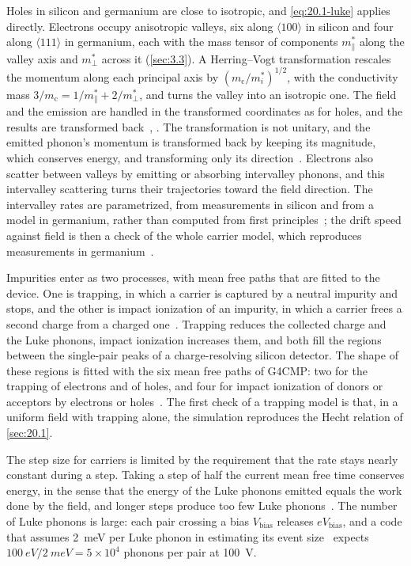 Holes in silicon and germanium are close to isotropic, and \cref{eq:20.1-luke} applies directly. Electrons occupy anisotropic valleys, six along $\langle100\rangle$ in silicon and four along $\langle111\rangle$ in germanium, each with the mass tensor of components $m^*_\parallel$ along the valley axis and $m^*_\perp$ across it (\cref{sec:3.3}). A Herring--Vogt transformation rescales the momentum along each principal axis by $(m_{\mathrm{c}}/m^*_i)^{1/2}$, with the conductivity mass $3/m_{\mathrm{c}} = 1/m^*_\parallel + 2/m^*_\perp$, and turns the valley into an isotropic one. The field and the emission are handled in the transformed coordinates as for holes, and the results are transformed back~\cite{herring1956transport}, \cite[Eqs.~(11)--(12)]{kelsey2023g4cmp}. The transformation is not unitary, and the emitted phonon's momentum is transformed back by keeping its magnitude, which conserves energy, and transforming only its direction~\cite[Sect.~V\,C]{leman2012invited}. Electrons also scatter between valleys by emitting or absorbing intervalley phonons, and this intervalley scattering turns their trajectories toward the field direction. The intervalley rates are parametrized, from measurements in silicon and from a model in germanium, rather than computed from first principles~\cite[Sect.~2.3]{kelsey2023g4cmp}; the drift speed against field is then a check of the whole carrier model, which reproduces measurements in germanium~\cite[Fig.~7]{kelsey2023g4cmp}.

Impurities enter as two processes, with mean free paths that are fitted to the device. One is trapping, in which a carrier is captured by a neutral impurity and stops, and the other is impact ionization of an impurity, in which a carrier frees a second charge from a charged one~\cite[Eqs.~(13)--(16)]{kelsey2023g4cmp}. Trapping reduces the collected charge and the Luke phonons, impact ionization increases them, and both fill the regions between the single-pair peaks of a charge-resolving silicon detector. The shape of these regions is fitted with the six mean free paths of G4CMP: two for the trapping of electrons and of holes, and four for impact ionization of donors or acceptors by electrons or holes~\cite[Sect.~2.3 and Fig.~6]{kelsey2023g4cmp}. The first check of a trapping model is that, in a uniform field with trapping alone, the simulation reproduces the Hecht relation of \cref{sec:20.1}.

The step size for carriers is limited by the requirement that the rate stays nearly constant during a step. Taking a step of half the current mean free time conserves energy, in the sense that the energy of the Luke phonons emitted equals the work done by the field, and longer steps produce too few Luke phonons~\cite[Sect.~V\,D]{leman2012invited}. The number of Luke phonons is large: each pair crossing a bias $V_{\mathrm{bias}}$ releases $eV_{\mathrm{bias}}$, and a code that assumes \SI{2}{meV} per Luke phonon in estimating its event size~\cite[Sect.~3.4]{kelsey2023g4cmp} expects $\SI{100}{eV}/\SI{2}{meV} = 5\times10^4$ phonons per pair at \SI{100}{V}.

